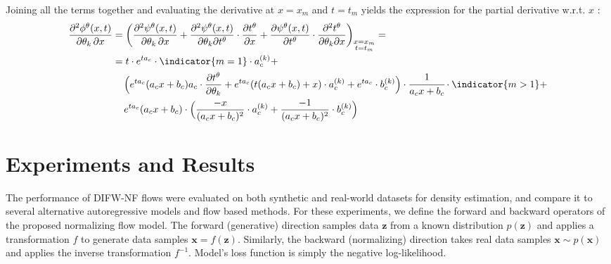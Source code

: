 Joining all the terms together and evaluating the derivative at $x = x_m$ and $t = t_m$ yields the expression for the partial derivative w.r.t. $x$
:
\begin{equation}
\begin{aligned}
  \frac{\partial^2 \phi^\theta(x,t)}{\partial \theta_k \, \partial x} &= 
  \bigg(
  \frac{\partial^2 \psi^\theta(x,t)}{\partial \theta_k \, \partial x} + 
  \frac{\partial^2 \psi^\theta(x,t)}{\partial \theta_k \partial t^\theta} \cdot
  \frac{\partial t^\theta}{\partial x} + 
  \frac{\partial \psi^\theta(x,t)}{\partial t^\theta} \cdot
  \frac{\partial^2 t^\theta}{\partial \theta_k \partial x}
  \bigg)_{\substack{x = x_m \\ t = t_m}} = \\ &= 
  t \cdot e^{t a_c} \cdot \indicator{m=1} \cdot a_c^{(k)} + \\
  &\quad\, \Big (
  e^{t a_c} ( a_c x + b_c) a_c \cdot \frac{\partial t^\theta}{\partial \theta_k} + 
  e^{t a_c} (t(a_c x + b_c) + x) \cdot a_c^{(k)} + 
  e^{t a_c}  \cdot b_c^{(k)} 
  \Big) \cdot
  \cfrac{1}{a_c x + b_c}  \cdot \indicator{m>1} + \\
  &\quad\, e^{t a_c} ( a_c x + b_c ) \cdot
  \Big (
  \frac{-x}{(a_c x + b_c)^2}\cdot a_c^{(k)} + 
  \frac{-1}{(a_c x + b_c)^2}\cdot b_c^{(k)}
  \Big )
\end{aligned}
\end{equation}




\section{Experiments and Results}\label{sec:results_6}

The performance of DIFW-NF flows were evaluated on both synthetic and real-world datasets for density estimation, and compare it to several alternative autoregressive models and flow based methods.
For these experiments, we define the forward and backward operators of the proposed normalizing flow model. The forward (generative) direction samples data $\mathbf{z}$ from a known distribution  $p(\mathbf{z})$ and applies a transformation $f$ to generate data samples $\mathbf{x} = f(\mathbf{z})$.
Similarly, the backward (normalizing) direction takes real data samples  $\mathbf{x} \sim p(\mathbf{x})$ and applies the inverse transformation $f^{-1}$. Model's loss function is simply the negative log-likelihood. 

